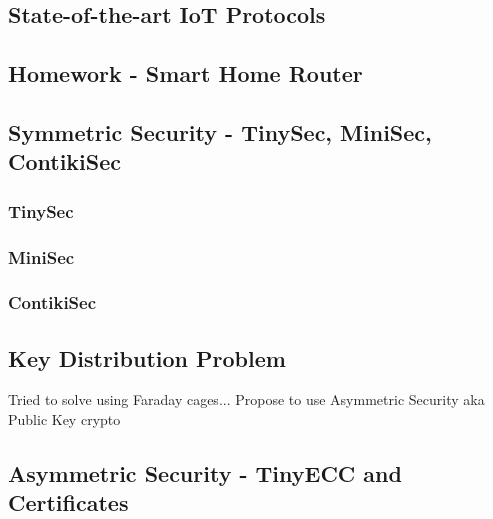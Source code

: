 \documentclass{mprop}
\begin{document}
\subsection{State-of-the-art IoT Protocols} %
\label{sub:state_of_the_art_iot_protocols}


\subsection{Homework - Smart Home Router} %
\label{sub:homework_smart_home_router}


\subsection{Symmetric Security - TinySec, MiniSec, ContikiSec} %
\label{sub:tinysec_minisec_contikisec}

\subsubsection{TinySec} %
\label{ssub:tinysec}


\subsubsection{MiniSec} %
\label{ssub:minisec}


\subsubsection{ContikiSec} %
\label{ssub:contikisec}

\cite{TinySec, luk2007minisec, ContikiSec}

\subsection{Key Distribution Problem} %
\label{sub:key_distribution_problem}
Tried to solve using Faraday cages...\cite{MessageBottle}
Propose to use Asymmetric Security aka Public Key crypto

\subsection{Asymmetric Security - TinyECC and Certificates} %
\label{sub:asymmetric_security}
\end{document}
